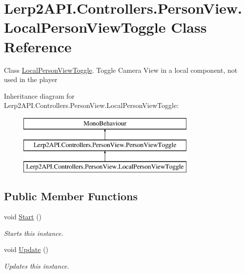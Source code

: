 \hypertarget{class_lerp2_a_p_i_1_1_controllers_1_1_person_view_1_1_local_person_view_toggle}{}\section{Lerp2\+A\+P\+I.\+Controllers.\+Person\+View.\+Local\+Person\+View\+Toggle Class Reference}
\label{class_lerp2_a_p_i_1_1_controllers_1_1_person_view_1_1_local_person_view_toggle}


Class \hyperlink{class_lerp2_a_p_i_1_1_controllers_1_1_person_view_1_1_local_person_view_toggle}{Local\+Person\+View\+Toggle}. Toggle Camera View in a local component, not used in the player  


Inheritance diagram for Lerp2\+A\+P\+I.\+Controllers.\+Person\+View.\+Local\+Person\+View\+Toggle\+:\begin{figure}[H]
\begin{center}
\leavevmode
\includegraphics[height=3.000000cm]{class_lerp2_a_p_i_1_1_controllers_1_1_person_view_1_1_local_person_view_toggle}
\end{center}
\end{figure}
\subsection*{Public Member Functions}
\begin{DoxyCompactItemize}
\item 
void \hyperlink{class_lerp2_a_p_i_1_1_controllers_1_1_person_view_1_1_local_person_view_toggle_a3147404908fe93ee7221cd0c2bb1fe36}{Start} ()
\begin{DoxyCompactList}\small\item\em Starts this instance. \end{DoxyCompactList}\item 
void \hyperlink{class_lerp2_a_p_i_1_1_controllers_1_1_person_view_1_1_local_person_view_toggle_a999d94f2c919735dab2df0ae54054dd8}{Update} ()
\begin{DoxyCompactList}\small\item\em Updates this instance. \end{DoxyCompactList}\end{DoxyCompactItemize}

